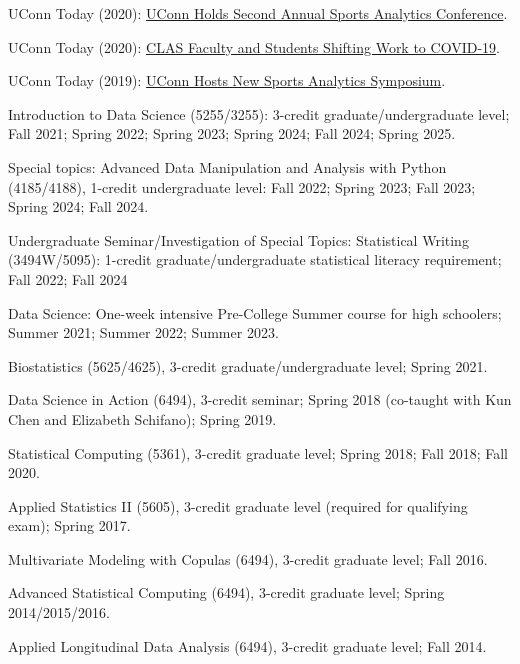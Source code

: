 \documentclass[Statistics]{vita}
\begin{document}
\begin{vita}
\begin{Services}
\begin{Media}
  \item UConn Today (2020): \href{https://today.uconn.edu/2020/10/uconn-holds-second-annual-sports-analytics-conference/}{UConn Holds Second Annual Sports Analytics Conference}.
  \item UConn Today (2020):
\href{https://today.uconn.edu/2020/04/clas-faculty-students-shifting-work-covid-19/}{CLAS Faculty and Students Shifting Work to COVID-19}.
  \item UConn Today (2019): \href{https://today.uconn.edu/school-stories/uconn-hosts-new-sports-analytics-symposium/}{UConn Hosts New Sports Analytics Symposium}.
  \end{Media}
\end{Services}
  \begin{TeachingExperience}
    \begin{UConn}
    \item Introduction to Data Science (5255/3255): 3-credit graduate/undergraduate level; Fall 2021; Spring 2022; Spring 2023; Spring 2024; Fall 2024; Spring 2025.
    \item Special topics: Advanced Data Manipulation and Analysis with Python (4185/4188), 1-credit undergraduate level: Fall 2022; Spring 2023; Fall 2023; Spring 2024; Fall 2024.
    \item Undergraduate Seminar/Investigation of Special Topics: Statistical Writing (3494W/5095): 1-credit graduate/undergraduate statistical literacy requirement; Fall 2022; Fall 2024
    \item Data Science: One-week intensive Pre-College Summer course for high schoolers; Summer 2021; Summer 2022; Summer 2023.
    \item Biostatistics (5625/4625), 3-credit graduate/undergraduate level; Spring 2021.
    \item Data Science in Action (6494), 3-credit seminar; Spring 2018 (co-taught with Kun Chen and Elizabeth Schifano); Spring 2019.
    \item Statistical Computing (5361), 3-credit graduate level; Spring 2018; Fall 2018; Fall 2020.
    \item Applied Statistics II (5605), 3-credit graduate level (required for qualifying exam); Spring 2017.
    \item Multivariate Modeling with Copulas (6494), 3-credit graduate level; Fall 2016.
    \item Advanced Statistical Computing (6494), 3-credit graduate level; Spring 2014/2015/2016.
    \item Applied Longitudinal Data Analysis (6494), 3-credit graduate level; Fall 2014.

\end{UConn}
\end{TeachingExperience}
\end{vita}
\end{document}
